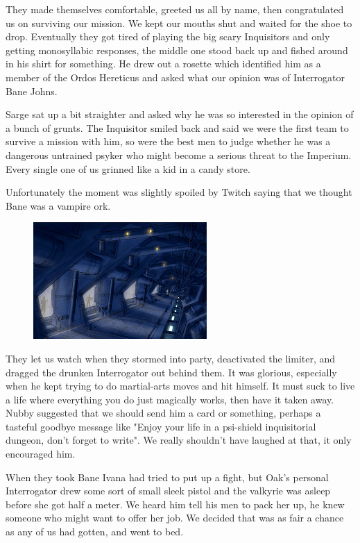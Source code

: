 They made themselves comfortable, greeted us all by name, then congratulated us on surviving our mission. 
We kept our mouths shut and waited for the shoe to drop. 
Eventually they got tired of playing the big scary Inquisitors and only getting monosyllabic responses, the middle one stood back up and fished around in his shirt for something. 
He drew out a rosette which identified him as a member of the Ordos Hereticus and asked what our opinion was of Interrogator Bane Johns.

Sarge sat up a bit straighter and asked why he was so interested in the opinion of a bunch of grunts. 
The Inquisitor smiled back and said we were the first team to survive a mission with him, so were the best men to judge whether he was a dangerous untrained psyker who might become a serious threat to the Imperium. 
Every single one of us grinned like a kid in a candy store. 


Unfortunately the moment was slightly spoiled by Twitch saying that we thought Bane was a vampire ork.

\begin{figure}
	\begin{center}
		\includegraphics[width=\figwidth]{pics/9/60.png}
	\end{center}
\end{figure}
They let us watch when they stormed into party, deactivated the limiter, and dragged the drunken Interrogator out behind them. 
It was glorious, especially when he kept trying to do martial-arts moves and hit himself. 
It must suck to live a life where everything you do just magically works, then have it taken away. 
Nubby suggested that we should send him a card or something, perhaps a tasteful goodbye message like "Enjoy your life in a psi-shield inquisitorial dungeon, don't forget to write". 
We really shouldn't have laughed at that, it only encouraged him.

When they took Bane Ivana had tried to put up a fight, but Oak's personal Interrogator drew some sort of small sleek pistol and the valkyrie was asleep before she got half a meter. 
We heard him tell his men to pack her up, he knew someone who might want to offer her job. 
We decided that was as fair a chance as any of us had gotten, and went to bed.


